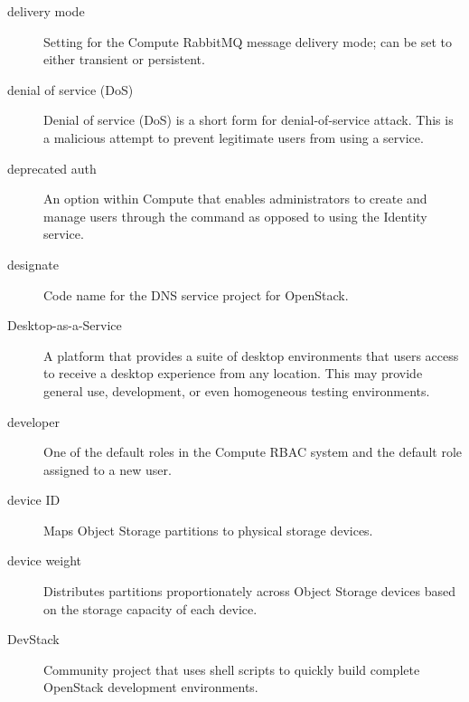 \documentclass[letterpaper,10pt,english]{sphinxmanual}
\begin{document}
\begin{description}
\item[{delivery mode}] \leavevmode{}\label{_source/glossary:term-delivery-mode}
Setting for the Compute RabbitMQ message delivery mode; can be
set to either transient or persistent.

\item[{denial of service (DoS)}] \leavevmode{}\label{_source/glossary:term-denial-of-service-dos}
Denial of service (DoS) is a short form for
denial-of-service attack. This is a malicious attempt to
prevent legitimate users from using a service.

\item[{deprecated auth}] \leavevmode{}\label{_source/glossary:term-deprecated-auth}
An option within Compute that enables administrators to create
and manage users through the  command as
opposed to using the Identity service.

\item[{designate}] \leavevmode{}\label{_source/glossary:term-designate}
Code name for the DNS service project for OpenStack.

\item[{Desktop-as-a-Service}] \leavevmode{}\label{_source/glossary:term-desktop-as-a-service}
A platform that provides a suite of desktop environments
that users access to receive a desktop experience from
any location. This may provide general use, development, or
even homogeneous testing environments.

\item[{developer}] \leavevmode{}\label{_source/glossary:term-developer}
One of the default roles in the Compute RBAC system and the
default role assigned to a new user.

\item[{device ID}] \leavevmode{}\label{_source/glossary:term-device-id}
Maps Object Storage partitions to physical storage
devices.

\item[{device weight}] \leavevmode{}\label{_source/glossary:term-device-weight}
Distributes partitions proportionately across Object Storage
devices based on the storage capacity of each device.

\item[{DevStack}] \leavevmode{}\label{_source/glossary:term-devstack}
Community project that uses shell scripts to quickly build
complete OpenStack development environments.


\end{description}
\end{document}
